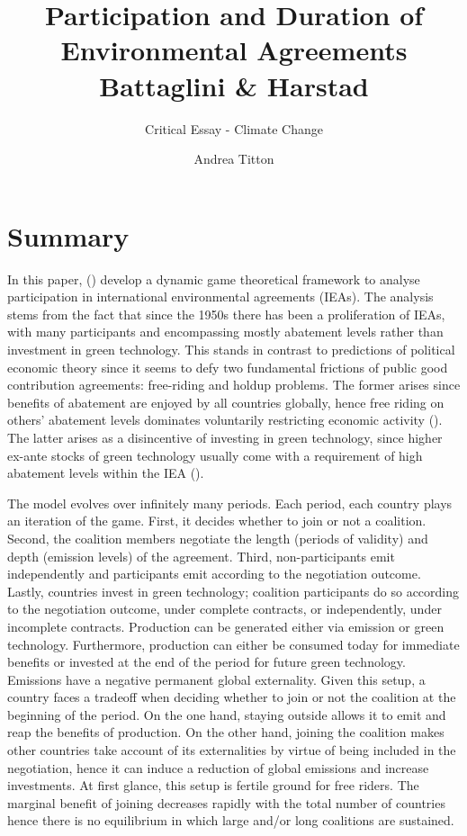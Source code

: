 \documentclass[american]{scrartcl}
\title{Participation and Duration of Environmental Agreements \\ Battaglini \& Harstad}
\subtitle{Critical Essay - Climate Change}
\author{Andrea Titton}
\newcommand{\citein}[1]{\citeauthor{#1} (\citeyear{#1})}
\begin{document}
\maketitle


\section{Summary}

In this paper, \citein{Battaglini2016} develop a dynamic game theoretical framework to analyse participation in international environmental agreements (IEAs). The analysis stems from the fact that since the 1950s there has been a proliferation of IEAs, with many participants and encompassing mostly abatement levels rather than investment in green technology. This stands in contrast to predictions of political economic theory since it seems to defy two fundamental frictions of public good contribution agreements: free-riding and holdup problems. The former arises since benefits of abatement are enjoyed by all countries globally, hence free riding on others' abatement levels dominates voluntarily restricting economic activity (\cite{EspnolaArredondo2011}). The latter arises as a disincentive of investing in green technology, since higher ex-ante stocks of green technology usually come with a requirement of high abatement levels within the IEA (\cite{Harstad2012}).

The model evolves over infinitely many periods. Each period, each country plays an iteration of the game. First, it decides whether to join or not a coalition. Second, the coalition members negotiate the length (periods of validity) and depth (emission levels) of the agreement. Third, non-participants emit independently and participants emit according to the negotiation outcome. Lastly, countries invest in green technology; coalition participants do so according to the negotiation outcome, under complete contracts, or independently, under incomplete contracts. Production can be generated either via emission or green technology. Furthermore, production can either be consumed today for immediate benefits or invested at the end of the period for future green technology. Emissions have a negative permanent global externality. Given this setup, a country faces a tradeoff when deciding whether to join or not the coalition at the beginning of the period. On the one hand, staying outside allows it to emit and reap the benefits of production. On the other hand, joining the coalition makes other countries take account of its externalities by virtue of being included in the negotiation, hence it can induce a reduction of global emissions and increase investments. At first glance, this setup is fertile ground for free riders. The marginal benefit of joining decreases rapidly with the total number of countries hence there is no equilibrium in which large and/or long coalitions are sustained.
\end{document}
